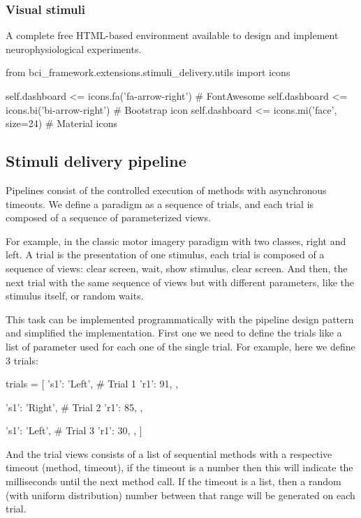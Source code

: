 \subsubsection{Visual stimuli}

A complete free HTML-based environment available to design and implement neurophysiological experiments.

\begin{python}
from bci_framework.extensions.stimuli_delivery.utils import icons

self.dashboard <= icons.fa('fa-arrow-right')   # FontAwesome
self.dashboard  <= icons.bi('bi-arrow-right')  # Bootstrap icon
self.dashboard  <= icons.mi('face', size=24)   # Material icons 
\end{python}

\subsection{Stimuli delivery pipeline}

Pipelines consist of the controlled execution of methods with asynchronous timeouts. We define a paradigm as a sequence of trials, and each trial is composed of a sequence of parameterized views. 

For example, in the classic motor imagery paradigm with two classes, right and left. A trial is the presentation of one stimulus, each trial is composed of a sequence of views: clear screen, wait, show stimulus, clear screen. And then, the next trial with the same sequence of views but with different parameters, like the stimulus itself, or random waits.

This task can be implemented programmatically with the pipeline design pattern and simplified the implementation. First one we need to define the trials like a list of  parameter used for each one of the single trial. For example, here we define 3 trials:

\begin{python}
trials = [
    {'s1': 'Left',  # Trial 1
     'r1': 91,
     },

    {'s1': 'Right',  # Trial 2
     'r1': 85,
     },

    {'s1': 'Left',  # Trial 3
     'r1': 30,
     },
]
\end{python}

And the trial views consists of a list of sequential methods with a respective timeout (method, timeout), if the timeout is a number then this will indicate the milliseconds until the next method call. If the timeout is a list, then a random (with uniform distribution) number between that range will be generated on each trial.

